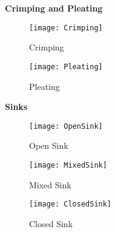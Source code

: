 \textbf{Crimping and Pleating}\\
\begin{figure*}
	\centering
	\begin{subfigure}[h]{0.49\textwidth}
		\texttt{[image: Crimping]}
		\caption{Crimping}
		\label{fig:crimping}
	\end{subfigure}
	\begin{subfigure}[h]{0.49\textwidth}
		\texttt{[image: Pleating]}
		\caption{Pleating}
		\label{fig:pleating}
	\end{subfigure}
\end{figure*}

\textbf{Sinks}\\
\begin{figure*}
	\centering
	\begin{subfigure}[h]{0.49\textwidth}
		\texttt{[image: OpenSink]}
		\caption{Open Sink}
		\label{fig:openSink}
	\end{subfigure}
	\begin{subfigure}[h]{0.49\textwidth}
		\texttt{[image: MixedSink]}
		\caption{Mixed Sink}
		\label{fig:mixedSink}
	\end{subfigure}
	\begin{subfigure}[h]{0.49\textwidth}
		\texttt{[image: ClosedSink]}
		\caption{Closed Sink}
		\label{fig:closedSink}
	\end{subfigure}
\end{figure*}









